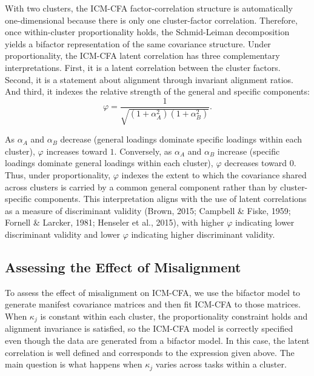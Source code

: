 \documentclass[
  american,
  man,floatsintext]{apa7}
\begin{document}
With two clusters, the ICM-CFA factor-correlation structure is automatically one-dimensional because there is only one cluster-factor correlation. Therefore, once within-cluster proportionality holds, the Schmid-Leiman decomposition yields a bifactor representation of the same covariance structure. Under proportionality, the ICM-CFA latent correlation has three complementary interpretations. First, it is a latent correlation between the cluster factors. Second, it is a statement about alignment through invariant alignment ratios. And third, it indexes the relative strength of the general and specific components:
\begin{equation}\label{bifaclatcor}
\varphi=\frac{1}{\sqrt{(1+\alpha_A^2)(1+\alpha_B^2)}}.
\end{equation}

As \(\alpha_A\) and \(\alpha_B\) decrease (general loadings dominate specific loadings within each cluster), \(\varphi\) increases toward \(1\). Conversely, as \(\alpha_A\) and \(\alpha_B\) increase (specific loadings dominate general loadings within each cluster), \(\varphi\) decreases toward \(0\). Thus, under proportionality, \(\varphi\) indexes the extent to which the covariance shared across clusters is carried by a common general component rather than by cluster-specific components. This interpretation aligns with the use of latent correlations as a measure of discriminant validity (Brown, 2015; Campbell \& Fiske, 1959; Fornell \& Larcker, 1981; Henseler et al., 2015), with higher \(\varphi\) indicating lower discriminant validity and lower \(\varphi\) indicating higher discriminant validity.

\subsection{Assessing the Effect of Misalignment}\label{assessing-the-effect-of-misalignment}

To assess the effect of misalignment on ICM-CFA, we use the bifactor model to generate manifest covariance matrices and then fit ICM-CFA to those matrices. When \(\kappa_j\) is constant within each cluster, the proportionality constraint holds and alignment invariance is satisfied, so the ICM-CFA model is correctly specified even though the data are generated from a bifactor model. In this case, the latent correlation is well defined and corresponds to the expression given above. The main question is what happens when \(\kappa_j\) varies across tasks within a cluster.
\end{document}
